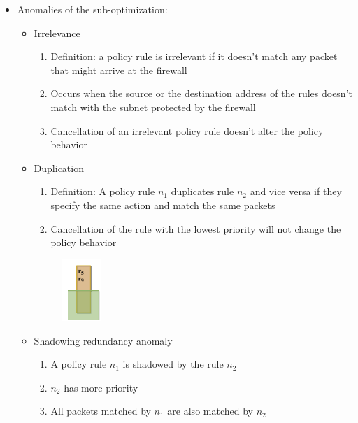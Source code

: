 \documentclass{article}
\begin{document}
\begin{itemize}
\begin{itemize}
\begin{itemize}
\begin{figure}[H]
            \end{figure}
          \item Anomalies of the sub-optimization:
            \begin{itemize}
              \item Irrelevance
                \begin{enumerate}
                  \item Definition: a policy rule is irrelevant if it doesn’t match any packet that might arrive at the firewall
                  \item Occurs when the source or the destination address of the rules doesn’t match with the subnet protected by the firewall
                  \item Cancellation of an irrelevant policy rule doesn’t alter the policy behavior
                \end{enumerate}
              \item Duplication
                \begin{enumerate}
                  \item Definition: A policy rule \(n_1\) duplicates rule \(n_2\) and vice versa if they specify the same action and match the same packets
                  \item Cancellation of the rule with the lowest priority will not change the policy behavior
                \end{enumerate}
                  \begin{figure}[H]
                    \centering
                    \includegraphics[width=0.15\textwidth]{figure/duplication.png}
                \end{figure}
              \item Shadowing redundancy anomaly
                \begin{enumerate}
                  \item A policy rule \(n_1\) is shadowed by the rule \(n_2\)
                  \item \(n_2\) has more priority
                  \item All packets matched by \(n_1\) are also matched by \(n_2\)

\end{enumerate}
\end{itemize}
\end{itemize}
\end{itemize}
\end{itemize}
\end{document}

